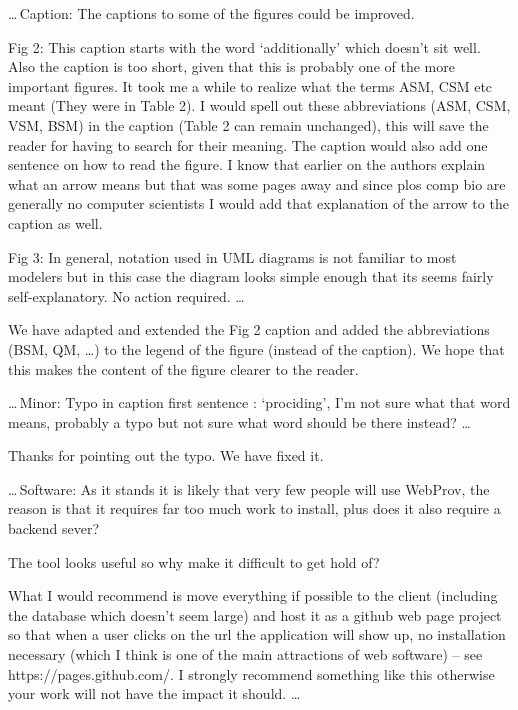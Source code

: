 \documentclass{article}
\begin{document}
\begin{mdframed}
\ldots\,Caption: The captions to some of the figures could be improved.

Fig 2: This caption starts with the word ‘additionally’ which doesn’t sit well.
Also the caption is too short, given that this is probably one of the more important figures.
It took me a while to realize what the terms ASM, CSM etc meant (They were in Table 2).
I would spell out these abbreviations (ASM, CSM, VSM, BSM) in the caption (Table 2 can remain unchanged), this will save the reader for having to search for their meaning.
The caption would also add one sentence on how to read the figure.
I know that earlier on the authors explain what an arrow means but that was some pages away and since plos comp bio are generally no computer scientists I would add that explanation of the arrow to the caption as well.

Fig 3: In general, notation used in UML diagrams is not familiar to most modelers but in this case the diagram looks simple enough that its seems fairly self-explanatory. No action required. \ldots
\end{mdframed}

We have adapted and extended the Fig 2 caption and added the abbreviations (BSM, QM, \dots) to the legend of the figure (instead of the caption).
We hope that this makes the content of the figure clearer to the reader.


\begin{mdframed}
\ldots\,Minor: Typo in caption first sentence : ‘prociding’, I’m not sure what that word means, probably a typo but not sure what word should be there instead? \ldots
\end{mdframed}

Thanks for pointing out the typo.
We have fixed it.

\begin{mdframed}
\ldots\,Software: As it stands it is likely that very few people will use WebProv, the reason is that it requires far too much work to install, plus does it also require a backend sever?

The tool looks useful so why make it difficult to get hold of?

What I would recommend is move everything if possible to the client (including the database which doesn’t seem large) and host it as a github web page project so that when a user clicks on the url the application will show up, no installation necessary (which I think is one of the main attractions of web software) – see https://pages.github.com/. I strongly recommend something like this otherwise your work will not have the impact it should. \ldots
\end{mdframed}
\end{document}
